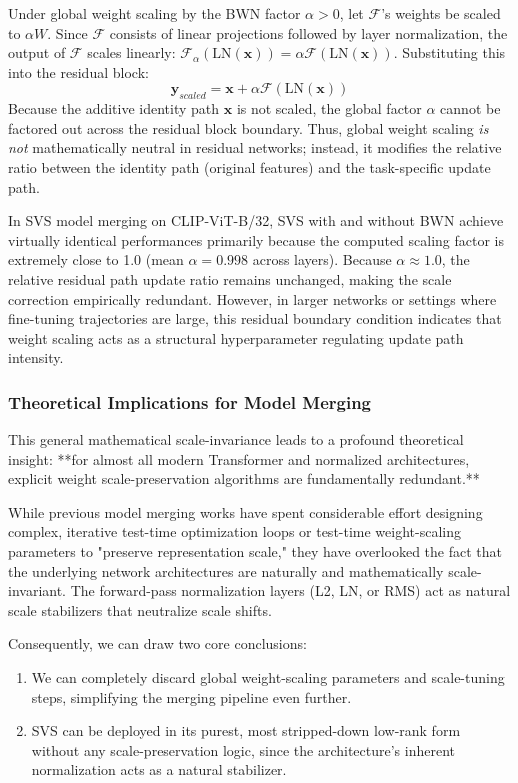 Under global weight scaling by the BWN factor $\alpha > 0$, let $\mathcal{F}$'s weights be scaled to $\alpha W$. Since $\mathcal{F}$ consists of linear projections followed by layer normalization, the output of $\mathcal{F}$ scales linearly: $\mathcal{F}_{\alpha}(\text{LN}(\mathbf{x})) = \alpha \mathcal{F}(\text{LN}(\mathbf{x}))$. Substituting this into the residual block:
\begin{equation}
    \mathbf{y}_{scaled} = \mathbf{x} + \alpha \mathcal{F}(\text{LN}(\mathbf{x}))
\end{equation}
Because the additive identity path $\mathbf{x}$ is not scaled, the global factor $\alpha$ cannot be factored out across the residual block boundary. Thus, global weight scaling \emph{is not} mathematically neutral in residual networks; instead, it modifies the relative ratio between the identity path (original features) and the task-specific update path. 

In SVS model merging on CLIP-ViT-B/32, SVS with and without BWN achieve virtually identical performances primarily because the computed scaling factor is extremely close to 1.0 (mean $\alpha = 0.998$ across layers). Because $\alpha \approx 1.0$, the relative residual path update ratio remains unchanged, making the scale correction empirically redundant. However, in larger networks or settings where fine-tuning trajectories are large, this residual boundary condition indicates that weight scaling acts as a structural hyperparameter regulating update path intensity.

\subsubsection{Theoretical Implications for Model Merging}
This general mathematical scale-invariance leads to a profound theoretical insight: **for almost all modern Transformer and normalized architectures, explicit weight scale-preservation algorithms are fundamentally redundant.** 

While previous model merging works have spent considerable effort designing complex, iterative test-time optimization loops or test-time weight-scaling parameters to "preserve representation scale," they have overlooked the fact that the underlying network architectures are naturally and mathematically scale-invariant. The forward-pass normalization layers (L2, LN, or RMS) act as natural scale stabilizers that neutralize scale shifts. 

Consequently, we can draw two core conclusions:
\begin{enumerate}
    \item We can completely discard global weight-scaling parameters and scale-tuning steps, simplifying the merging pipeline even further.
    \item SVS can be deployed in its purest, most stripped-down low-rank form without any scale-preservation logic, since the architecture's inherent normalization acts as a natural stabilizer.
\end{enumerate}


